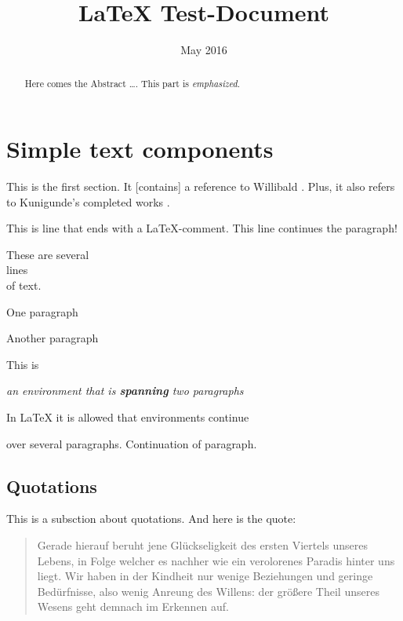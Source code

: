 \documentclass[12pt, english, a4paper]{article}
\begin{document}
\title{LaTeX Test-Document}

\date{May 2016}
 
\maketitle

\begin{abstract}
Here comes the Abstract \ldots. This part is {\em emphasized}.
\end{abstract}

\newpage

\tableofcontents

\section{Simple text components}

This is the first section. It [contains] a reference to
Willibald \citet[32]{Willibald2015}. Plus, it also refers to
Kunigunde's completed works \citep{Kunigunde2010}.

This is line that ends with a LaTeX-comment. %
This line continues the paragraph!

These are several \\
lines \\
of text.

One paragraph

Another paragraph

This is {\em an environment that {is \bf spanning} two paragraphs

In LaTeX it is allowed that environments continue} over several
paragraphs.
Continuation of paragraph.

\subsection{Quotations}

This is a subsction about quotations. And here is the quote:

\begin{quote}
    Gerade hierauf beruht jene Glückseligkeit des ersten Viertels unseres Lebens,
    in Folge welcher es nachher wie ein verolorenes Paradis hinter uns liegt.
    Wir haben in der Kindheit nur wenige Beziehungen und geringe Bedürfnisse, also wenig
    Anreung des Willens: der größere Theil unseres Wesens geht demnach im Erkennen auf.
    \cite[199]{Schopenhauer1851}
\end{quote}
\end{document}
